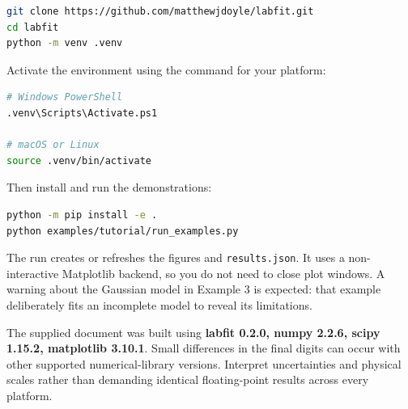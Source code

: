 \documentclass[
  british,
  10pt,
  a4paper,
]{article}
\newcommand{\passthrough}[1]{#1}
\begin{document}
\par\noindent\begin{minipage}{\linewidth}

\begin{lstlisting}[language=sh]
git clone https://github.com/matthewjdoyle/labfit.git
cd labfit
python -m venv .venv
\end{lstlisting}

\end{minipage}\par

Activate the environment using the command for your platform:

\par\noindent\begin{minipage}{\linewidth}

\begin{lstlisting}[language=sh]
# Windows PowerShell
.venv\Scripts\Activate.ps1

# macOS or Linux
source .venv/bin/activate
\end{lstlisting}

\end{minipage}\par

Then install and run the demonstrations:

\par\noindent\begin{minipage}{\linewidth}

\begin{lstlisting}[language=sh]
python -m pip install -e .
python examples/tutorial/run_examples.py
\end{lstlisting}

\end{minipage}\par

The run creates or refreshes the figures and
\passthrough{\lstinline!results.json!}. It uses a non-interactive
Matplotlib backend, so you do not need to close plot windows. A warning
about the Gaussian model in Example 3 is expected: that example
deliberately fits an incomplete model to reveal its limitations.

The supplied document was built using \textbf{labfit 0.2.0, numpy 2.2.6,
scipy 1.15.2, matplotlib 3.10.1}. Small differences in the final digits
can occur with other supported numerical-library versions. Interpret
uncertainties and physical scales rather than demanding identical
floating-point results across every platform.
\end{document}
